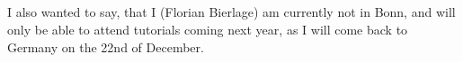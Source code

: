 \documentclass[]{scrartcl}
\begin{document}
\subsection{}

\newpage

I also wanted to say, that I (Florian Bierlage) am currently not in Bonn, and will only be able to attend tutorials coming next year, as I will come back to Germany on the 22nd of December.
\end{document}

